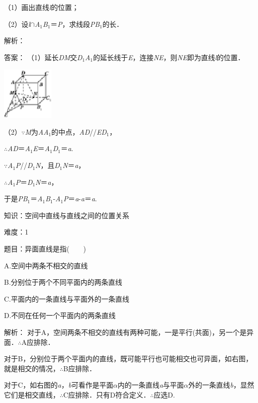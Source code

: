 \documentclass{article} %
\begin{document}
（1）画出直线\textit{l}的位置；

（2）设\textit{l}$\mathrm{\cap}$\textit{A}${}_{1}$\textit{B}${}_{1}$＝\textit{P}，求线段\textit{PB}${}_{1}$的长．

解析：

答案：
（1）延长\textit{DM}交\textit{D}${}_{1}$\textit{A}${}_{1}$的延长线于\textit{E}，连接\textit{NE}，则\textit{NE}即为直线\textit{l}的位置．

\includegraphics*[width=1.00in, height=1.02in, keepaspectratio=false]{image99}

（2）$\mathrm{\because}$\textit{M}为\textit{AA}${}_{1}$的中点，\textit{AD}//\textit{ED}${}_{1}$，

$\mathrm{\therefore}$\textit{AD}＝\textit{A}${}_{1}$\textit{E}＝\textit{A}${}_{1}$\textit{D}${}_{1}$＝\textit{a}.

$\mathrm{\because}$\textit{A}${}_{1}$\textit{P}//\textit{D}${}_{1}$\textit{N}，且\textit{D}${}_{1}$\textit{N}＝\textit{a}，

$\mathrm{\therefore}$\textit{A}${}_{1}$\textit{P}＝\textit{D}${}_{1}$\textit{N}＝\textit{a}，

于是\textit{PB}${}_{1}$＝\textit{A}${}_{1}$\textit{B}${}_{1}$-\textit{A}${}_{1}$\textit{P}＝\textit{a}-\textit{a}＝\textit{a}.





知识：空间中直线与直线之间的位置关系

难度：1

题目：异面直线是指(　　)

A.空间中两条不相交的直线

B.分别位于两个不同平面内的两条直线

C.平面内的一条直线与平面外的一条直线

D.不同在任何一个平面内的两条直线

解析：
对于A，空间两条不相交的直线有两种可能，一是平行(共面)，另一个是异面．$\mathrm{\therefore}$A应排除．

对于B，分别位于两个平面内的直线，既可能平行也可能相交也可异面，如右图，就是相交的情况，$\mathrm{\therefore}$B应排除．

对于C，如右图的\textit{a}，\textit{b}可看作是平面\textit{$\alpha$}内的一条直线\textit{a}与平面\textit{$\alpha$}外的一条直线\textit{b}，显然它们是相交直线，$\mathrm{\therefore}$C应排除．只有D符合定义．$\mathrm{\therefore}$应选D.
\end{document}
